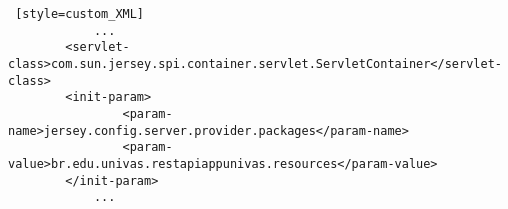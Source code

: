 \begin{lstlisting} [style=custom_XML]
			...
		<servlet-class>com.sun.jersey.spi.container.servlet.ServletContainer</servlet-class>
		<init-param>
				<param-name>jersey.config.server.provider.packages</param-name>
				<param-value>br.edu.univas.restapiappunivas.resources</param-value>
		</init-param>
			...
\end{lstlisting}